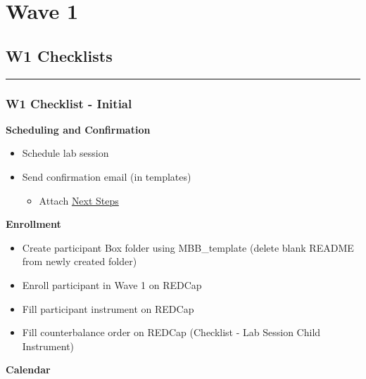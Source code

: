\documentclass[
]{book}
\providecommand{\tightlist}{%
  \setlength{\itemsep}{0pt}\setlength{\parskip}{0pt}}
\begin{document}
\hypertarget{wave-1}{%
\chapter{Wave 1}\label{wave-1}}

\hypertarget{w1-checklists}{%
\section{W1 Checklists}\label{w1-checklists}}

\begin{center}\rule{0.5\linewidth}{0.5pt}\end{center}

\hypertarget{w1-checklist---initial}{%
\subsection{W1 Checklist - Initial}\label{w1-checklist---initial}}

\textbf{Scheduling and Confirmation}

\begin{itemize}
\tightlist
\item
  Schedule lab session
\item
  Send confirmation email (in templates)

  \begin{itemize}
  \tightlist
  \item
    Attach \href{https://app.box.com/file/630326369239}{Next Steps}
  \end{itemize}
\end{itemize}

\textbf{Enrollment}

\begin{itemize}
\tightlist
\item
  Create participant Box folder using MBB\_template (delete blank README from newly created folder)
\item
  Enroll participant in Wave 1 on REDCap
\item
  Fill participant instrument on REDCap
\item
  Fill counterbalance order on REDCap (Checklist - Lab Session Child Instrument)
\end{itemize}

\textbf{Calendar}
\end{document}
